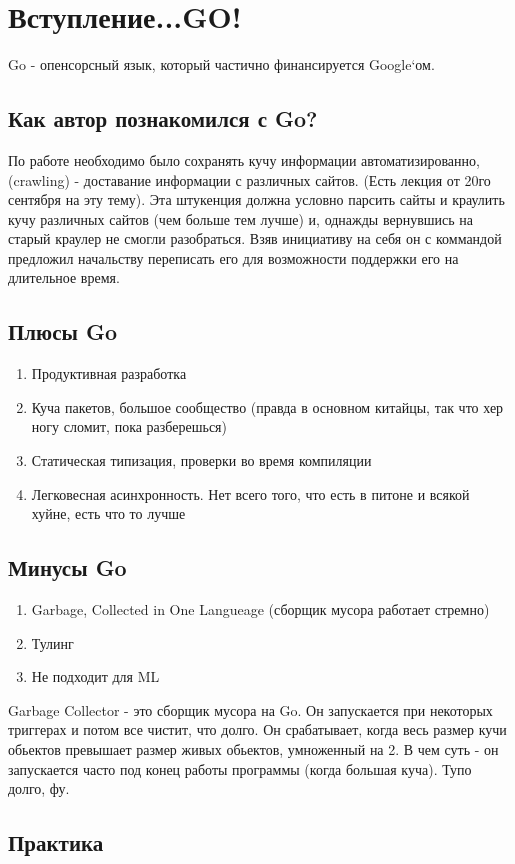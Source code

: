 \documentclass[a4paper,12pt]{article}
\begin{document}
\section{Вступление...GO!}
Go - опенсорсный язык, который частично финансируется Google`ом.
\subsection{Как автор познакомился с Go?}
По работе необходимо было сохранять кучу информации автоматизированно, (crawling) - 
доставание информации с различных сайтов. (Есть лекция от 20го сентября на эту тему). Эта
штукенция должна условно парсить сайты и краулить кучу различных сайтов (чем больше тем лучше)
 и, однажды вернувшись на старый краулер не смогли разобраться. Взяв инициативу на себя он 
 с коммандой предложил начальству переписать его для возможности поддержки его на длительное время. 
 \subsection{Плюсы Go}
 \begin{enumerate}
    \item Продуктивная разработка
    \item Куча пакетов, большое сообщество (правда в основном китайцы, так что хер ногу сломит, пока разберешься)
    \item Статическая типизация, проверки во время компиляции
    \item Легковесная асинхронность. Нет всего того, что есть в питоне и всякой хуйне, есть что то лучше
 \end{enumerate}
\subsection{Минусы Go}
\begin{enumerate}
    \item Garbage, Collected in One Langueage (сборщик мусора работает стремно)
    \item Тулинг
    \item Не подходит для ML
\end{enumerate}
Garbage Collector - это сборщик мусора на Go. Он запускается при некоторых триггерах и потом все чистит, что долго. 
Он срабатывает, когда весь размер кучи обьектов превышает размер живых обьектов, умноженный на 2. В чем суть - он запускается часто 
под конец работы программы (когда большая куча). Тупо долго, фу. 
\subsection{Практика}
\end{document}
